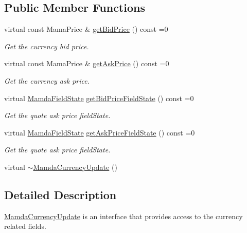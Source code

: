 \subsection*{Public Member Functions}
\begin{CompactItemize}
\item 
virtual const Mama\-Price \& \hyperlink{classWombat_1_1MamdaCurrencyUpdate_b3e155fe59d759e148c319ff92e8003b}{get\-Bid\-Price} () const =0
\begin{CompactList}\small\item\em Get the currency bid price. \item\end{CompactList}\item 
virtual const Mama\-Price \& \hyperlink{classWombat_1_1MamdaCurrencyUpdate_a176e102ce277c24aa48d4ee2767ad6f}{get\-Ask\-Price} () const =0
\begin{CompactList}\small\item\em Get the currency ask price. \item\end{CompactList}\item 
virtual \hyperlink{namespaceWombat_93aac974f2ab713554fd12a1fa3b7d2a}{Mamda\-Field\-State} \hyperlink{classWombat_1_1MamdaCurrencyUpdate_cb8f38e834099963b5bee3d771b6573a}{get\-Bid\-Price\-Field\-State} () const =0
\begin{CompactList}\small\item\em Get the quote ask price field\-State. \item\end{CompactList}\item 
virtual \hyperlink{namespaceWombat_93aac974f2ab713554fd12a1fa3b7d2a}{Mamda\-Field\-State} \hyperlink{classWombat_1_1MamdaCurrencyUpdate_43b7f8357bf87770254d215bd949d2b5}{get\-Ask\-Price\-Field\-State} () const =0
\begin{CompactList}\small\item\em Get the quote ask price field\-State. \item\end{CompactList}\item 
virtual \hyperlink{classWombat_1_1MamdaCurrencyUpdate_e5503eb4785cb3a1817a94b235b3cd3d}{$\sim$Mamda\-Currency\-Update} ()
\end{CompactItemize}


\subsection{Detailed Description}
\hyperlink{classWombat_1_1MamdaCurrencyUpdate}{Mamda\-Currency\-Update} is an interface that provides access to the currency related fields. 



